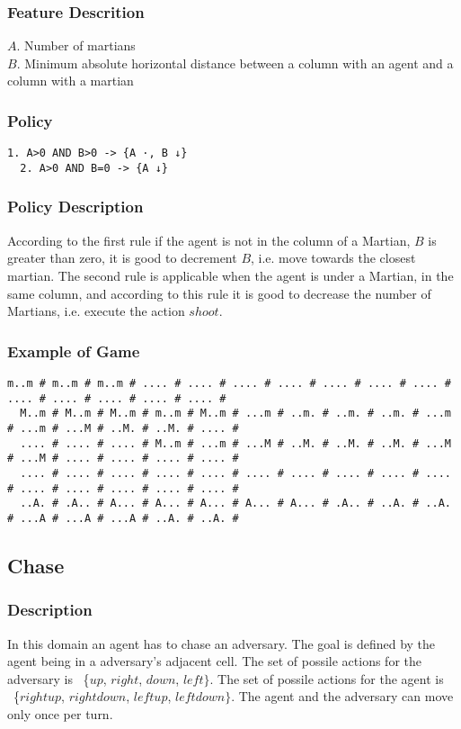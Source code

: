 \documentclass[a4paper]{article}
\begin{document}
\subsubsection{Feature Descrition}
$A$. Number of martians\\
$B$. Minimum absolute horizontal distance between a column with an agent and a column with a martian

\subsubsection{Policy}
\begin{Verbatim}[fontsize=\footnotesize]
  1. A>0 AND B>0 -> {A ·, B ↓}
  2. A>0 AND B=0 -> {A ↓}
\end{Verbatim}

\subsubsection{Policy Description}
According to the first rule if the agent is not in the column of a Martian, $B$ is greater than zero, it is good to decrement $B$, i.e. move towards the closest martian. The second rule is applicable when the agent is under a Martian, in the same column, and according to this rule it is good to decrease the number of Martians, i.e. execute the action $shoot$.

\subsubsection{Example of Game}
\begin{Verbatim}[fontsize=\footnotesize]
  m..m # m..m # m..m # .... # .... # .... # .... # .... # .... # .... # .... # .... # .... # .... # .... #
  M..m # M..m # M..m # m..m # M..m # ...m # ..m. # ..m. # ..m. # ...m # ...m # ...M # ..M. # ..M. # .... #
  .... # .... # .... # M..m # ...m # ...M # ..M. # ..M. # ..M. # ...M # ...M # .... # .... # .... # .... #
  .... # .... # .... # .... # .... # .... # .... # .... # .... # .... # .... # .... # .... # .... # .... #
  ..A. # .A.. # A... # A... # A... # A... # A... # .A.. # ..A. # ..A. # ...A # ...A # ...A # ..A. # ..A. #
\end{Verbatim}

\subsection{Chase}
\subsubsection{Description}
In this domain an agent has to chase an adversary. The goal is defined by the agent being in a adversary's adjacent cell. The set of possile actions for the adversary is ~\{$up$, $right$, $down$, $left\}$. The set of possile actions for the agent is ~\{$rightup$, $rightdown$, $leftup$, $leftdown\}$. The agent and the adversary can move only once per turn.
\end{document}
